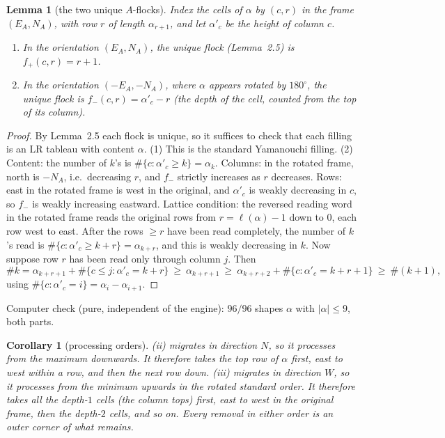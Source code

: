 \documentclass[11pt]{article}
\newtheorem{lemma}[theorem]{Lemma}
\newtheorem{corollary}[theorem]{Corollary}
\theoremstyle{definition}
\begin{document}
\begin{lemma}[the two unique $A$-flocks]\label{lem:flocks}
Index the cells of $\alpha$ by $(c,r)$ in the frame $(E_A,N_A)$, with row $r$ of length $\alpha_{r+1}$, and let $\alpha'_c$ be the
height of column $c$.
\begin{enumerate}
\item In the orientation $(E_A,N_A)$, the unique flock (Lemma~2.5) is $f_+(c,r)=r+1$.
\item In the orientation $(-E_A,-N_A)$, where $\alpha$ appears rotated by $180^\circ$, the unique flock is $f_-(c,r)=\alpha'_c-r$
(the depth of the cell, counted from the top of its column).
\end{enumerate}
\end{lemma}
\begin{proof}
By Lemma~2.5 each flock is unique, so it suffices to check that each filling is an LR tableau with content $\alpha$.
(1) This is the standard Yamanouchi filling.
(2) Content: the number of $k$'s is $\#\{c:\alpha'_c\ge k\}=\alpha_k$.
Columns: in the rotated frame, north is $-N_A$, i.e.\ decreasing $r$, and $f_-$ strictly increases as $r$ decreases.
Rows: east in the rotated frame is west in the original, and $\alpha'_c$ is weakly decreasing in $c$, so $f_-$ is weakly
increasing eastward.
Lattice condition: the reversed reading word in the rotated frame reads the original rows from $r=\ell(\alpha)-1$ down to $0$, each
row west to east. After the rows $\ge r$ have been read completely, the number of $k$'s read is $\#\{c:\alpha'_c\ge k+r\}=
\alpha_{k+r}$, and this is weakly decreasing in $k$. Now suppose row $r$ has been read only through column $j$. Then
\[\#k=\alpha_{k+r+1}+\#\{c\le j:\alpha'_c=k+r\}\ \ge\ \alpha_{k+r+1}\ \ge\ \alpha_{k+r+2}+\#\{c:\alpha'_c=k+r+1\}\ \ge\ \#(k+1),\]
using $\#\{c:\alpha'_c=i\}=\alpha_i-\alpha_{i+1}$.
\end{proof}
Computer check (pure, independent of the engine): $96/96$ shapes $\alpha$ with $|\alpha|\le9$, both parts.

\begin{corollary}[processing orders]\label{cor:orders}
(ii) migrates in direction $N$, so it processes from the maximum downwards. It therefore takes the top row of $\alpha$ first, east
to west within a row, and then the next row down. (iii) migrates in direction $W$, so it processes from the minimum upwards in the
rotated standard order. It therefore takes all the depth-$1$ cells (the column tops) first, east to west in the original frame,
then the depth-$2$ cells, and so on. Every removal in either order is an outer corner of what remains.
\end{corollary}
\end{document}
